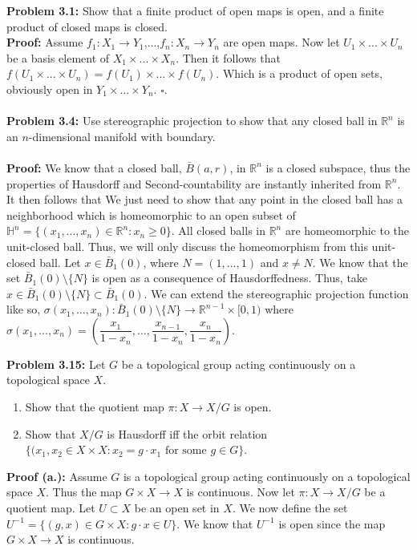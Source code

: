 \documentclass{article}
\begin{document}
  \textbf{Problem 3.1:} Show that a finite product of open maps is open, and a finite product of closed maps is closed.\\
  \textbf{Proof:} Assume \(f_1:X_1\to Y_1\),...,\(f_n:X_n\to Y_n\) are open maps. Now let \(U_1\times...\times U_n\) be a basis element of \(X_1\times...\times X_n\). Then it follows that \(f(U_1\times...\times U_n)=f(U_1)\times...\times f(U_n)\). Which is a product of open sets, obviously open in \(Y_1\times ...\times Y_n\). \(\square\).\\
  \\
  \textbf{Problem 3.4:} Use stereographic projection to show that any closed ball in \(\mathbb{R}^n\) is an \(n\)-dimensional manifold with boundary.\\
  \\
  \textbf{Proof:} We know that a closed ball, \(\bar{B}(a,r)\), in \(\mathbb{R}^n\) is a  closed subspace, thus the properties of Hausdorff and Second-countability are instantly inherited from \(\mathbb{R}^n\). It then follows that We just need to show that any point in the closed ball has a neighborhood which is homeomorphic to an open subset of \(\mathbb{H}^n=\{(x_1,...,x_n)\in\mathbb{R}^n:x_n\geq 0\}\). All closed balls in \(\mathbb{R}^n\) are homeomorphic to the unit-closed ball. Thus, we will only discuss the homeomorphism from this unit-closed ball. Let \(x\in \bar{B}_1(0)\), where \(N=(1,...,1)\) and \(x\neq N\). We know that the set \(\bar{B}_1(0)\setminus \{N\}\) is open as a consequence of Hausdorffedness. Thus, take \(x\in\bar{B}_1(0)\setminus\{N\}\subset \bar{B}_1(0)\). We can extend the stereographic projection function like so, 
  \(\sigma(x_1,...,x_n):\bar{B}_1(0)\setminus \{N\}\to \mathbb{R}^{n-1}\times [0,1)\) where \(\sigma(x_1,...,x_n)=(\dfrac{x_1}{1-x_n},...,\dfrac{x_{n-1}}{1-x_n},\dfrac{x_n}{1-x_n})\).

  \textbf{Problem 3.15:} Let \(G\) be a topological group acting continuously on a topological space \(X\).
  \begin{enumerate}[label=(\alph*.)]
      \item Show that the quotient map \(\pi: X\to X/G\) is open.
      \item Show that \(X/G\) is Hausdorff iff the orbit relation \(\{(x_1,x_2\in X\times X:x_2=g\cdot x_1 \text{ for some }g\in G\}\).
  \end{enumerate}

  \textbf{Proof (a.):} Assume \(G\) is a topological group acting continuously on a topological space \(X\). Thus the map \(G\times X\to X\) is continuous. Now let \(\pi:X\to X/G\) be a quotient map. Let \(U\subset X\) be an open set in \(X\). We now define the set \(U^{-1}=\{(g,x)\in G\times X: g\cdot x\in U\}\). We know that \(U^{-1}\) is open since the map \(G\times X\to X\) is continuous. 
\end{document}
